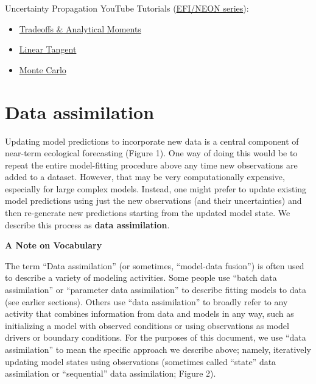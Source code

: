 \documentclass[
]{book}
\providecommand{\tightlist}{%
  \setlength{\itemsep}{0pt}\setlength{\parskip}{0pt}}
\begin{document}
Uncertainty Propagation YouTube Tutorials (\href{https://www.youtube.com/watch?v=kq0DTcotpA0\&list=PLLWiknuNGd50Lc3rft4kFPc_oxAhiQ-6s}{EFI/NEON series}):

\begin{itemize}
\tightlist
\item
  \href{https://youtu.be/fxJX729jHnY}{Tradeoffs \& Analytical Moments}
\item
  \href{https://youtu.be/-PZrKjSEuiw}{Linear Tangent}
\item
  \href{https://youtu.be/Wdob95zfqe8}{Monte Carlo}
\end{itemize}

\hypertarget{data-assimilation}{%
\section{Data assimilation}\label{data-assimilation}}

Updating model predictions to incorporate new data is a central component of near-term ecological forecasting (Figure 1). One way of doing this would be to repeat the entire model-fitting procedure above any time new observations are added to a dataset. However, that may be very computationally expensive, especially for large complex models. Instead, one might prefer to update existing model predictions using just the new observations (and their uncertainties) and then re-generate new predictions starting from the updated model state. We describe this process as \textbf{data assimilation}.

\textbf{A Note on Vocabulary}

The term ``Data assimilation'' (or sometimes, ``model-data fusion'') is often used to describe a variety of modeling activities. Some people use ``batch data assimilation'' or ``parameter data assimilation'' to describe fitting models to data (see earlier sections). Others use ``data assimilation'' to broadly refer to any activity that combines information from data and models in any way, such as initializing a model with observed conditions or using observations as model drivers or boundary conditions. For the purposes of this document, we use ``data assimilation'' to mean the specific approach we describe above; namely, iteratively updating model states using observations (sometimes called ``state'' data assimilation or ``sequential'' data assimilation; Figure 2).
\end{document}
